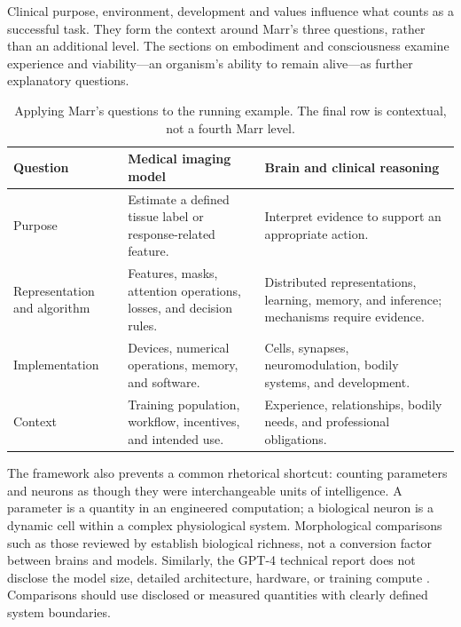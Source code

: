 \documentclass[11pt,a4paper]{article}
\begin{document}
Clinical purpose, environment, development and values influence what counts as a successful task. They form the context around Marr's three questions, rather than an additional level. The sections on embodiment and consciousness examine experience and viability---an organism's ability to remain alive---as further explanatory questions.

\begin{table}[htbp]\centering\small
\caption{Applying Marr's questions to the running example. The final row is contextual, not a fourth Marr level.}
\begin{tabularx}{\linewidth}{p{27mm}XX}\toprule
Question & Medical imaging model & Brain and clinical reasoning \\\midrule
Purpose & Estimate a defined tissue label or response-related feature. & Interpret evidence to support an appropriate action.\\
Representation and algorithm & Features, masks, attention operations, losses, and decision rules. & Distributed representations, learning, memory, and inference; mechanisms require evidence.\\
Implementation & Devices, numerical operations, memory, and software. & Cells, synapses, neuromodulation, bodily systems, and development.\\
Context & Training population, workflow, incentives, and intended use. & Experience, relationships, bodily needs, and professional obligations.\\\bottomrule
\end{tabularx}\label{tab:marr}
\end{table}

The framework also prevents a common rhetorical shortcut: counting parameters and neurons as though they were interchangeable units of intelligence. A parameter is a quantity in an engineered computation; a biological neuron is a dynamic cell within a complex physiological system. Morphological comparisons such as those reviewed by \citet{defelipe2011} establish biological richness, not a conversion factor between brains and models. Similarly, the GPT-4 technical report does not disclose the model size, detailed architecture, hardware, or training compute \citep{openai2023}. Comparisons should use disclosed or measured quantities with clearly defined system boundaries.
\end{document}
